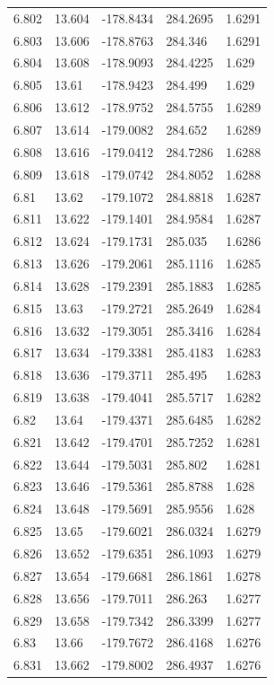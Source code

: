 \begin{tabular}{lllll}
6.802 & 13.604 & -178.8434 & 284.2695 & 1.6291 \\
6.803 & 13.606 & -178.8763 & 284.346 & 1.6291 \\
6.804 & 13.608 & -178.9093 & 284.4225 & 1.629 \\
6.805 & 13.61 & -178.9423 & 284.499 & 1.629 \\
6.806 & 13.612 & -178.9752 & 284.5755 & 1.6289 \\
6.807 & 13.614 & -179.0082 & 284.652 & 1.6289 \\
6.808 & 13.616 & -179.0412 & 284.7286 & 1.6288 \\
6.809 & 13.618 & -179.0742 & 284.8052 & 1.6288 \\
6.81 & 13.62 & -179.1072 & 284.8818 & 1.6287 \\
6.811 & 13.622 & -179.1401 & 284.9584 & 1.6287 \\
6.812 & 13.624 & -179.1731 & 285.035 & 1.6286 \\
6.813 & 13.626 & -179.2061 & 285.1116 & 1.6285 \\
6.814 & 13.628 & -179.2391 & 285.1883 & 1.6285 \\
6.815 & 13.63 & -179.2721 & 285.2649 & 1.6284 \\
6.816 & 13.632 & -179.3051 & 285.3416 & 1.6284 \\
6.817 & 13.634 & -179.3381 & 285.4183 & 1.6283 \\
6.818 & 13.636 & -179.3711 & 285.495 & 1.6283 \\
6.819 & 13.638 & -179.4041 & 285.5717 & 1.6282 \\
6.82 & 13.64 & -179.4371 & 285.6485 & 1.6282 \\
6.821 & 13.642 & -179.4701 & 285.7252 & 1.6281 \\
6.822 & 13.644 & -179.5031 & 285.802 & 1.6281 \\
6.823 & 13.646 & -179.5361 & 285.8788 & 1.628 \\
6.824 & 13.648 & -179.5691 & 285.9556 & 1.628 \\
6.825 & 13.65 & -179.6021 & 286.0324 & 1.6279 \\
6.826 & 13.652 & -179.6351 & 286.1093 & 1.6279 \\
6.827 & 13.654 & -179.6681 & 286.1861 & 1.6278 \\
6.828 & 13.656 & -179.7011 & 286.263 & 1.6277 \\
6.829 & 13.658 & -179.7342 & 286.3399 & 1.6277 \\
6.83 & 13.66 & -179.7672 & 286.4168 & 1.6276 \\
6.831 & 13.662 & -179.8002 & 286.4937 & 1.6276 \\

\end{tabular}
